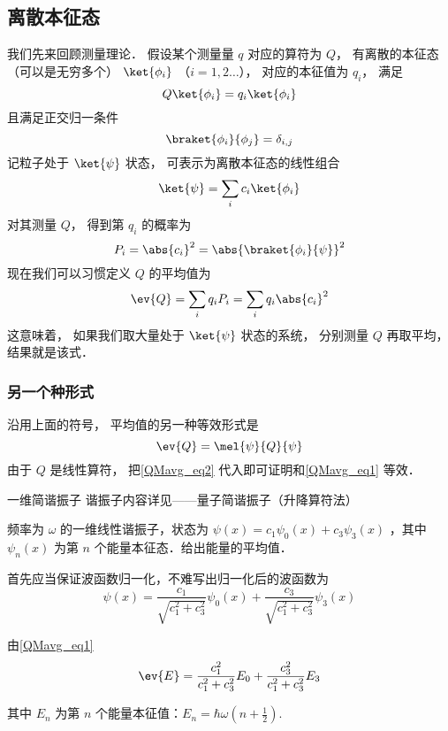 

\subsection{离散本征态}

我们先来回顾测量理论． 假设某个测量量 $q$ 对应的算符为 $Q$， 有离散的本征态（可以是无穷多个） $\ket{\phi_i}$ （$i = 1,2\dots$）， 对应的本征值为 $q_i$， 满足
\begin{equation}\label{QMavg_eq3}
Q\ket{\phi_i} = q_i \ket{\phi_i}
\end{equation}
且满足正交归一条件
\begin{equation}\label{QMavg_eq4}
\braket{\phi_i}{\phi_j} = \delta_{i,j}
\end{equation}
记粒子处于 $\ket{\psi}$ 状态， 可表示为离散本征态的线性组合
\begin{equation}\label{QMavg_eq2}
\ket{\psi} = \sum_i c_i \ket{\phi_i}
\end{equation}
对其测量 $Q$， 得到第 $q_i$ 的概率为
\begin{equation}
P_i = \abs{c_i}^2 = \abs{\braket{\phi_i}{\psi}}^2
\end{equation}
现在我们可以习惯定义 $Q$ 的平均值为
\begin{equation}\label{QMavg_eq1}
\ev{Q} = \sum_i q_i P_i = \sum_i q_i \abs{c_i}^2
\end{equation}
这意味着， 如果我们取大量处于 $\ket{\psi}$ 状态的系统， 分别测量 $Q$ 再取平均， 结果就是该式．

\subsubsection{另一个种形式}
沿用上面的符号， 平均值的另一种等效形式是
\begin{equation}
\ev{Q} = \mel{\psi}{Q}{\psi}
\end{equation}
由于 $Q$ 是线性算符， 把\autoref{QMavg_eq2} 代入即可证明和\autoref{QMavg_eq1} 等效．

\begin{example}{一维简谐振子}
谐振子内容详见——量子简谐振子（升降算符法）

频率为 $\omega$ 的一维线性谐振子，状态为 $\psi(x)=c_1 \psi_0(x)+c_3\psi_3(x)$ ，其中 $\psi_n(x)$ 为第 $n$ 个能量本征态．给出能量的平均值．

首先应当保证波函数归一化，不难写出归一化后的波函数为
\begin{equation}
\psi(x)=\frac{c_1}{\sqrt{c_1^2+c_3^2}}\psi_0(x)+\frac{c_3}{\sqrt{c_1^2+c_3^2}}\psi_3(x)
\end{equation}

由\autoref{QMavg_eq1}
\begin{equation}
\ev{E}=\frac{c_1^2}{c_1^2+c_3^2} E_0+\frac{c_3^2}{c_1^2+c_3^2} E_3
\end{equation}

其中 $E_n$ 为第 $n$ 个能量本征值：$E_n=\hbar \omega(n+\frac{1}{2})$.
\end{example}


